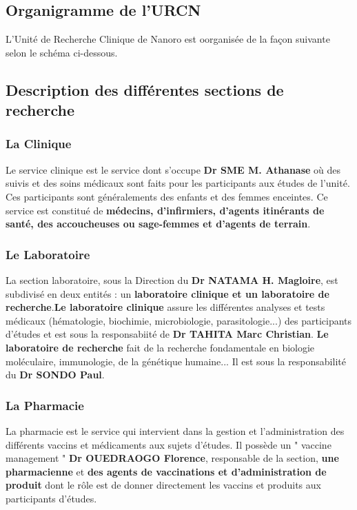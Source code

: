 \documentclass[12pt,a4paper]{report}
\begin{document}
			\subsection{Organigramme de l'URCN}
			
			L'Unité de Recherche Clinique de Nanoro est oorganisée de la façon suivante selon le schéma ci-dessous.
			
			\subsection{Description des différentes sections de recherche}
			
				\subsubsection{La Clinique}
				
				Le service clinique est le service dont s'occupe \textbf{Dr SME M. Athanase} où des suivis et des soins médicaux sont faits pour les participants aux études de l'unité. Ces participants sont généralements des enfants et des femmes enceintes. Ce service est constitué de \textbf{médecins, d'infirmiers, d'agents itinérants de santé, des accoucheuses ou sage-femmes et d'agents de terrain}.
				
				\subsubsection{Le Laboratoire}
				
				La section laboratoire, sous la Direction du \textbf{Dr NATAMA H. Magloire}, est subdivisé en deux entités : un \textbf{laboratoire clinique et un laboratoire de recherche}.\textbf{Le laboratoire clinique} assure les différentes analyses et tests médicaux (hématologie, biochimie, microbiologie, parasitologie...) des participants d'études et est sous la responsabiité de \textbf{Dr TAHITA Marc Christian}. \textbf{Le laboratoire de recherche} fait de la recherche fondamentale en biologie moléculaire, immunologie, de la génétique humaine... Il est sous la responsabilité du \textbf{Dr SONDO Paul}.
				
				\subsubsection{La Pharmacie}
				
				La pharmacie est le service qui intervient dans la gestion et l'administration des différents vaccins et médicaments aux sujets d'études. Il possède un " vaccine management " \textbf{Dr OUEDRAOGO Florence}, responsable de la section, \textbf{une pharmacienne} et \textbf{des agents de vaccinations et d'administration de produit} dont le rôle est de donner directement les vaccins et produits aux participants d'études.
				
\end{document}
